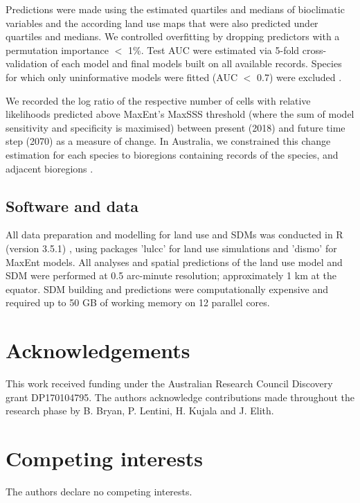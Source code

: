 Predictions were made using the estimated quartiles and medians of bioclimatic variables and the according land use maps that were also predicted under quartiles and medians. We controlled overfitting by dropping predictors with a permutation importance  $<$ 1\%. Test AUC were estimated via 5-fold cross-validation of each model and final models built on all available records. Species for which only uninformative models were fitted (AUC $<$ 0.7) were excluded \citep{baldwin_use_2009}.

We recorded the log ratio of the respective number of cells with relative likelihoods predicted above MaxEnt's MaxSSS threshold \citep{liu_selection_2016} (where the sum of model sensitivity and specificity is maximised) between present (2018) and future time step (2070) as a measure of change. In Australia, we constrained this change estimation for each species to bioregions containing records of the species, and adjacent bioregions \citep{moran-ordonez_evaluating_2016}.

\subsection{Software and data}

All data preparation and modelling for land use and SDMs was conducted in R (version 3.5.1) \citep{r_development_core_team_r_2008}, using packages 'lulcc' \citep{moulds_open_2015} for land use simulations and 'dismo' \citep{hijmans_package_2011} for MaxEnt \citep{phillips_internet_nodate} models. All analyses and spatial predictions of the land use model and SDM were performed at 0.5 arc-minute resolution; approximately 1 km at the equator. SDM building and predictions were computationally expensive and required up to 50 GB of working memory on 12 parallel cores.

\section{Acknowledgements}
This work received funding under the Australian Research Council Discovery grant DP170104795. The authors acknowledge contributions made throughout the research phase by B. Bryan, P. Lentini, H. Kujala and J. Elith.

\section{Competing interests}
The authors declare no competing interests.

